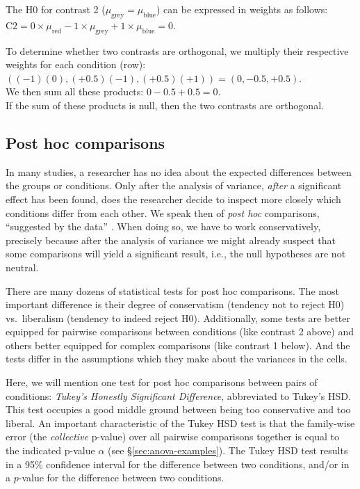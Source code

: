 \documentclass[
]{book}
\begin{document}
The H0 for contrast 2 (\(\mu_\textrm{grey} = \mu_\textrm{blue}\)) can be
expressed in weights as follows:
\(\textrm{C2} = 0\times \mu_\textrm{red} -1 \times \mu_\textrm{grey} +1 \times \mu_\textrm{blue} = 0\).

To determine whether two contrasts are orthogonal, we multiply
their respective weights for each condition (row):\\
\(( (-1)(0), (+0.5)(-1), (+0.5)(+1) )= (0, -0.5, +0.5)\).\\
We then sum all these products:
\(0 -0.5 + 0.5 = 0\).\\
If the sum of these products is null, then the two
contrasts are orthogonal.

\hypertarget{sec:anova-oneway-posthoc}{%
\subsection{Post hoc comparisons}\label{sec:anova-oneway-posthoc}}

In many studies, a researcher has no idea about the expected differences
between the groups or conditions. Only after the analysis of variance,
\emph{after} a significant effect has been found, does the researcher decide
to inspect more closely which conditions differ from each other. We speak
then of \emph{post hoc} comparisons, ``suggested by the data'' \citep[ p.200]{MD04}.
When doing so, we have to work conservatively, precisely because
after the analysis of variance we might already suspect that some
comparisons will yield a significant result,
i.e., the null hypotheses are not neutral.

There are many dozens of statistical tests for post hoc
comparisons. The most important difference is their degree of conservatism
(tendency not to reject H0) vs.~liberalism (tendency to indeed reject H0).
Additionally, some tests are better equipped
for pairwise comparisons between conditions (like contrast 2 above) and
others better equipped for complex comparisons
(like contrast 1 below). And the tests differ in the assumptions
which they make about the variances in the cells.

Here, we will mention one test
for post hoc comparisons between pairs of conditions: \emph{Tukey's
Honestly Significant Difference}, abbreviated to Tukey's HSD. This test
occupies a good middle ground between being too conservative and too liberal. An
important characteristic of the Tukey HSD test is that the family-wise
error (the \emph{collective} p-value) over all pairwise comparisons together
is equal to the indicated p-value
\(\alpha\) (see §\ref{sec:anova-examples}). The Tukey HSD test results in
a 95\% confidence interval for the difference between two conditions,
and/or in a \(p\)-value for the difference between two conditions.
\end{document}
